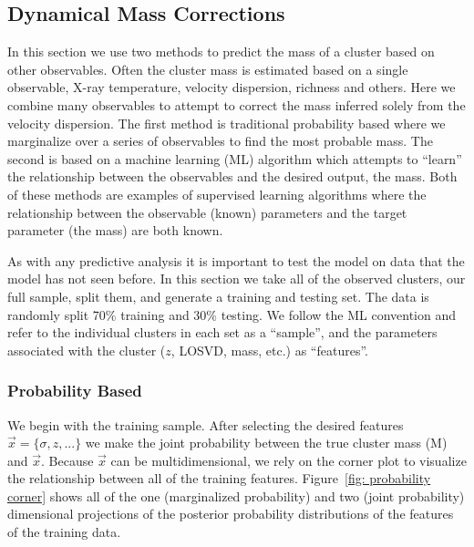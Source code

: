 \documentclass[apj, revtex4]{emulateapj}
\begin{document}
\subsection{Dynamical Mass Corrections}
In this section we use two methods to predict the mass of a cluster based on other observables. Often the cluster mass is estimated based on a single observable, X-ray temperature, velocity dispersion, richness and others. Here we combine many observables to attempt to correct the mass inferred solely from the velocity dispersion. The first method is traditional probability based where we marginalize over a series of observables to find the most probable mass. The second is based on a machine learning (ML) algorithm which attempts to ``learn'' the relationship between the observables and the desired output, the mass. Both of these methods are examples of supervised learning algorithms where the relationship between the observable (known) parameters and the target parameter (the mass) are both known.

As with any predictive analysis it is important to test the model on data that the model has not seen before. In this section we take all of the observed clusters, our full sample, split them, and generate a training and testing set. The data is randomly split 70\% training and 30\% testing. We follow the ML convention and refer to the individual clusters in each set as a ``sample'', and the parameters associated with the cluster ($z$, LOSVD, mass, etc.) as ``features''.  

\subsubsection{Probability Based}
We begin with the training sample. After selecting the desired features $\vec{x} = \{\sigma, z, ...\}$ we make the joint probability between the true cluster mass (M) and $\vec{x}$. Because $\vec{x}$ can be multidimensional, we rely on the corner plot to visualize the relationship between all of the training features. Figure~\ref{fig: probability corner} shows all of the one (marginalized probability) and two (joint probability) dimensional projections of the posterior probability distributions of the features of the training data.
\end{document}
